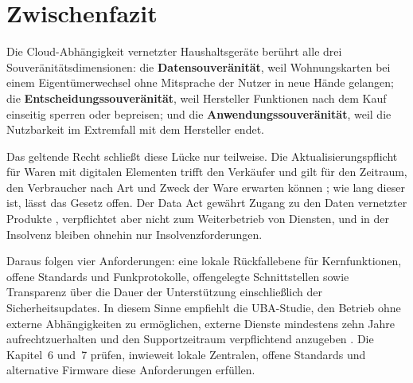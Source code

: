 \section{Zwischenfazit}\label{sec:folgen-zwischenfazit}

Die Cloud-Abhängigkeit vernetzter Haushaltsgeräte berührt alle drei
Souveränitätsdimensionen: die \textbf{Datensouveränität}, weil Wohnungskarten
bei einem Eigentümerwechsel ohne Mitsprache der Nutzer in neue Hände
gelangen; die \textbf{Entscheidungssouveränität}, weil Hersteller Funktionen
nach dem Kauf einseitig sperren oder bepreisen; und die
\textbf{Anwendungssouveränität}, weil die Nutzbarkeit im Extremfall mit dem
Hersteller endet.

Das geltende Recht schließt diese Lücke nur teilweise. Die
Aktualisierungspflicht für Waren mit digitalen Elementen trifft den
Verkäufer und gilt für den Zeitraum, den Verbraucher nach Art und Zweck der
Ware erwarten können \autocite[vgl.][§~475b Abs.~4 Nr.~2]{bgb:2026}; wie lang
dieser ist, lässt das Gesetz offen. Der Data Act gewährt Zugang zu den Daten
vernetzter Produkte \autocite[vgl.][Art.~4]{dataact:2023}, verpflichtet aber
nicht zum Weiterbetrieb von Diensten, und in der Insolvenz bleiben ohnehin
nur Insolvenzforderungen.

Daraus folgen vier Anforderungen: eine lokale Rückfallebene für
Kernfunktionen, offene Standards und Funkprotokolle, offengelegte
Schnittstellen sowie Transparenz über die Dauer der Unterstützung
einschließlich der Sicherheitsupdates. In diesem Sinne empfiehlt die
\acrshort{UBA}-Studie, den Betrieb ohne externe Abhängigkeiten zu ermöglichen,
externe Dienste mindestens zehn Jahre aufrechtzuerhalten und den
Supportzeitraum verpflichtend anzugeben
\autocite[vgl.][S.~18\,f.]{jaegererben:2023}. Die Kapitel~6 und~7 prüfen,
inwieweit lokale Zentralen, offene Standards und alternative Firmware diese
Anforderungen erfüllen.
